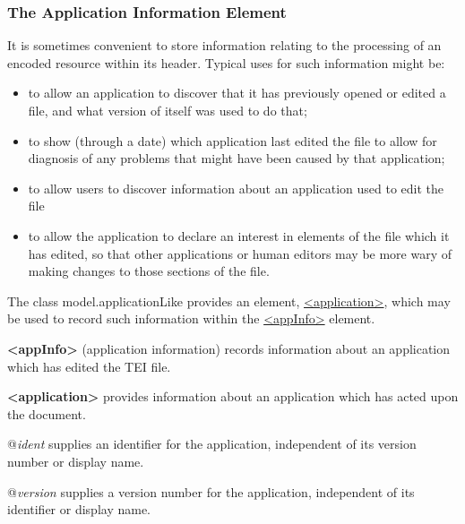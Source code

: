 \subsubsection[{The Application Information Element}]{The Application Information Element}\label{HDAPP}\par
It is sometimes convenient to store information relating to the processing of an encoded resource within its header. Typical uses for such information might be: \begin{itemize}
\item to allow an application to discover that it has previously opened or edited a file, and what version of itself was used to do that;
\item to show (through a date) which application last edited the file to allow for diagnosis of any problems that might have been caused by that application;
\item to allow users to discover information about an application used to edit the file
\item to allow the application to declare an interest in elements of the file which it has edited, so that other applications or human editors may be more wary of making changes to those sections of the file.
\end{itemize} \par
The class \textsf{model.applicationLike} provides an element, \hyperref[TEI.application]{<application>}, which may be used to record such information within the \hyperref[TEI.appInfo]{<appInfo>} element.
\begin{sansreflist}
  
\item [\textbf{<appInfo>}] (application information) records information about an application which has edited the TEI file.
\item [\textbf{<application>}] provides information about an application which has acted upon the document.\hfil\\[-10pt]\begin{sansreflist}
    \item[@{\itshape ident}]
  supplies an identifier for the application, independent of its version number or display name.
    \item[@{\itshape version}]
  supplies a version number for the application, independent of its identifier or display name.
\end{sansreflist}  
\end{sansreflist}
\par

